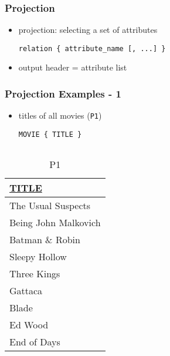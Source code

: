 \documentclass[dvipsnames]{beamer}
\theoremstyle{plain}
\begin{document}
\begin{frame}[fragile]
  \frametitle{Projection}

  \begin{itemize}
    \item \alert{projection}: selecting a set of attributes
    \begin{lstlisting}
relation { attribute_name [, ...] }
    \end{lstlisting}

    \medskip
    \item output header = attribute list
  \end{itemize}
\end{frame}

\begin{frame}[fragile]
  \frametitle{Projection Examples - 1}

  \begin{itemize}
      \item titles of all movies (\texttt{P1})
    \begin{lstlisting}
MOVIE { TITLE }
    \end{lstlisting}
  \end{itemize}

  \vspace{-10pt}
  \begin{columns}[b]
    \begin{tiny}
    \begin{table}
      \caption{P1}
      \begin{tabular}{|l|}\hline
\underline{TITLE}             \\[2pt]\hline\hline
The Usual Suspects            \\\hline
Being John Malkovich          \\\hline
Batman \& Robin               \\\hline
Sleepy Hollow                 \\\hline
Three Kings                   \\\hline
Gattaca                       \\\hline
Blade                         \\\hline
Ed Wood                       \\\hline
End of Days                   \\\hline
      \end{tabular}
    \end{table}
    \end{tiny}


\end{columns}
\end{frame}
\end{document}
